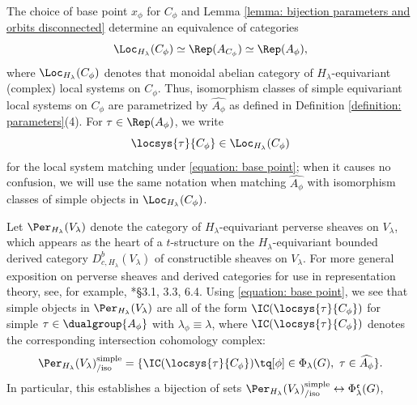 \documentclass[11pt,letterpaper]{amsart}
\numberwithin{equation}{section}
\begin{document}
The choice of base point $x_\phi$ for $C_\phi$ and Lemma \ref{lemma: bijection parameters and orbits disconnected} determine an equivalence of categories
\begin{equation}\label{equation: base point}
\Loc_{H_\lambda}(C_\phi) \simeq \Rep(A_{C_\phi})
\simeq
\Rep(A_\phi),
\end{equation}
where $\Loc_{H_\lambda}(C_\phi)$ denotes that monoidal abelian category of $H_\lambda$-equivariant (complex) local systems on $C_\phi$.
Thus, isomorphism classes of simple equivariant local systems on $C_\phi$ are parametrized by $\widehat{A_\phi}$ as defined in Definition \ref{definition: parameters}(4).
For $\tau \in \Rep(A_\phi)$, we write 
\[
\locsys{\tau}{C_\phi} \in \Loc_{H_{\lambda}}(C_\phi)
\]
for the local system matching under \eqref{equation: base point}; when it causes no confusion, we will use the same notation when matching $\widehat{A_\phi}$ with  isomorphism classes of simple objects in $\Loc_{H_{\lambda}}(C_\phi)$.

Let $\Per_{H_\lambda}(V_\lambda)$ denote the category of $H_\lambda$-equivariant perverse sheaves on $V_\lambda$, which appears as the heart of a $t$-structure on the $H_\lambda$-equivariant bounded derived category $D^b_{c,H_\lambda}(V_\lambda)$ of constructible sheaves on $V_\lambda$. 
For more general exposition on perverse sheaves and derived categories for use in representation theory, see, for example, \cite{Ach21}*{\S 3.1, 3.3, 6.4}. Using \eqref{equation: base point}, we see that simple objects in $\Per_{H_\lambda}(V_\lambda)$ are all of the form $\IC(\locsys{\tau}{C_\phi})$ for simple $\tau \in \dualgroup{A_\phi}$ with $\lambda_\phi \equiv \lambda$, where $\IC(\locsys{\tau}{C_\phi})$ denotes 
the corresponding intersection cohomology complex:
\begin{equation}\label{eq: simple perverse sheaves classified}
\Per_{H_\lambda}(V_\lambda)_{\text{/iso}}^{\text{simple}}=\{\IC(\locsys{\tau}{C_\phi}) \tq [\phi]\in \Phi_{\lambda}(G),\  \tau \in \widehat{A_\phi} \}.
\end{equation}
In particular, this establishes a bijection of sets
$\Per_{H_{\lambda}}(V_{\lambda})^{\mathrm{simple}}_{/\mathrm{iso}} \leftrightarrow \Phi^\mathfrak{e}_\lambda(G)$,
\end{document}
